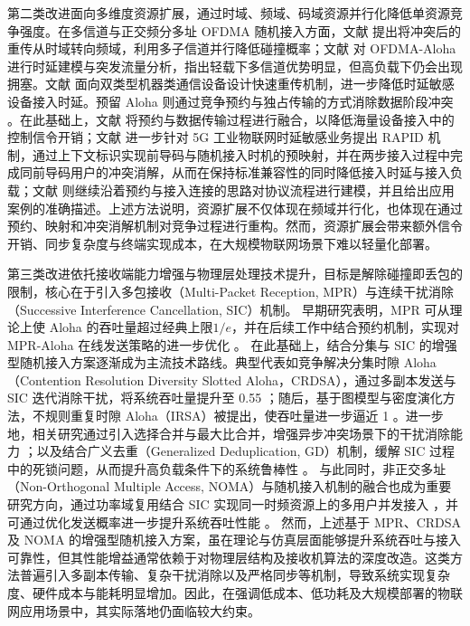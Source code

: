 第二类改进面向多维度资源扩展，通过时域、频域、码域资源并行化降低单资源竞争强度。在多信道与正交频分多址 OFDMA 随机接入方面，文献 \cite{2006_Multichannel} 提出将冲突后的重传从时域转向频域，利用多子信道并行降低碰撞概率；文献 \cite{2013_OFDMA,2015_OFDMA} 对 OFDMA-Aloha 进行时延建模与突发流量分析，指出轻载下多信道优势明显，但高负载下仍会出现拥塞。文献\cite{2020_FastRetrial} 面向双类型机器类通信设备设计快速重传机制，进一步降低时延敏感设备接入时延。预留 Aloha 则通过竞争预约与独占传输的方式消除数据阶段冲突 \cite{1973_RAloha}。在此基础上，文献 \cite{2015_HybridRA} 将预约与数据传输过程进行融合，以降低海量设备接入中的控制信令开销；文献\cite{2019_KimRAPID} 进一步针对 5G 工业物联网时延敏感业务提出 RAPID 机制，通过上下文标识实现前导码与随机接入时机的预映射，并在两步接入过程中完成同前导码用户的冲突消解，从而在保持标准兼容性的同时降低接入时延与接入负载；文献 \cite{2024_zhao}则继续沿着预约与接入连接的思路对协议流程进行建模，并且给出应用案例的准确描述。上述方法说明，资源扩展不仅体现在频域并行化，也体现在通过预约、映射和冲突消解机制对竞争过程进行重构。然而，资源扩展会带来额外信令开销、同步复杂度与终端实现成本，在大规模物联网场景下难以轻量化部署。




第三类改进依托接收端能力增强与物理层处理技术提升，目标是解除碰撞即丢包的限制，核心在于引入多包接收（Multi-Packet Reception, MPR）与连续干扰消除（Successive Interference Cancellation, SIC）机制。
早期研究表明，MPR 可从理论上使 Aloha 的吞吐量超过经典上限$1/e$\cite{1988_MPR,2005_MPR}，并在后续工作中结合预约机制，实现对 MPR-Aloha 在线发送策略的进一步优化 \cite{2022_MPR}。
在此基础上，结合分集与 SIC 的增强型随机接入方案逐渐成为主流技术路线。典型代表如竞争解决分集时隙 Aloha（Contention Resolution Diversity Slotted Aloha，CRDSA），通过多副本发送与 SIC 迭代消除干扰，将系统吞吐量提升至 0.55 \cite{2007_CRDSA}；随后，基于图模型与密度演化方法，不规则重复时隙 Aloha（IRSA）被提出，使吞吐量进一步逼近 1 \cite{2011_GraphCRDSA}。进一步地，相关研究通过引入选择合并与最大比合并，增强异步冲突场景下的干扰消除能力 \cite{2018_enhanced_CRDSA}；以及结合广义去重（Generalized Deduplication, GD）机制，缓解 SIC 过程中的死锁问题，从而提升高负载条件下的系统鲁棒性 \cite{2024_CRDSA}。
与此同时，非正交多址（Non-Orthogonal Multiple Access, NOMA）与随机接入机制的融合也成为重要研究方向，通过功率域复用结合 SIC 实现同一时频资源上的多用户并发接入 \cite{2017_NOMA,2017_NOMA2,2021_NOMA}，并可通过优化发送概率进一步提升系统吞吐性能 \cite{2021_NOMA}。
然而，上述基于 MPR、CRDSA 及 NOMA 的增强型随机接入方案，虽在理论与仿真层面能够提升系统吞吐与接入可靠性，但其性能增益通常依赖于对物理层结构及接收机算法的深度改造。这类方法普遍引入多副本传输、复杂干扰消除以及严格同步等机制，导致系统实现复杂度、硬件成本与能耗明显增加。因此，在强调低成本、低功耗及大规模部署的物联网应用场景中，其实际落地仍面临较大约束。

